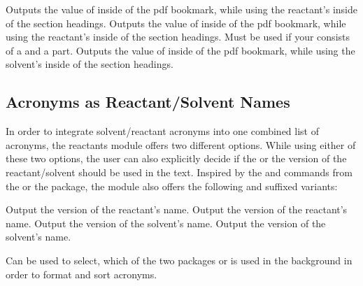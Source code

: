 \documentclass{chemmacros-manual}
\begin{document}
\begin{commands}
  Outputs the value of  inside of the \ac{pdf} bookmark, while using the reactant's 
   inside of the  section headings. 
  Outputs the value of  inside of the \ac{pdf} bookmark, while using the reactant's 
   inside of the  section headings. Must be used if your  consists of a 
  and a    part. 
  Outputs the value of  inside of the \ac{pdf} bookmark, while using the solvent's 
   inside of the  section headings.
\end{commands}


\subsection{Acronyms as Reactant/Solvent Names}\label{sec:acronyms-in-reactants}

In order to integrate solvent/reactant acronyms into one combined list of acronyms, the 
reactants module offers two different options. While using either of these two options, the 
user can also explicitly decide if the  or the  version of the 
reactant/solvent should be used in the text. Inspired by the  and  commands 
from the  or the  package, the  module 
also offers the following  and  suffixed variants:

\begin{commands}
  Output the  version of the reactant's name.
  Output the  version of the reactant's name.
  Output the  version of the solvent's name.
  Output the  version of the solvent's name.
\end{commands}

\begin{options}
  Can be used to select, which of the two packages  or  
  is used in the background in order to format and sort acronyms.
\end{options}

\begin{example}
  \par
  \par
\end{example}
\end{document}
